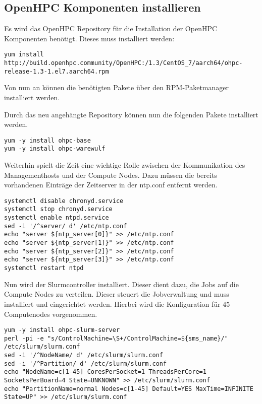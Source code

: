 \subsection{OpenHPC Komponenten installieren}
Es wird das OpenHPC Repository für die Installation der OpenHPC Komponenten benötigt. Dieses muss installiert werden:

\begin{lstlisting}
yum install http://build.openhpc.community/OpenHPC:/1.3/CentOS_7/aarch64/ohpc-release-1.3-1.el7.aarch64.rpm
\end{lstlisting}

Von nun an können die benötigten Pakete über den RPM-Paketmanager installiert werden.

Durch das neu angehängte Repository können nun die folgenden Pakete installiert werden.

\begin{lstlisting}
yum -y install ohpc-base
yum -y install ohpc-warewulf
\end{lstlisting}

Weiterhin spielt die Zeit eine wichtige Rolle zwischen der Kommunikation des Managementhosts und der Compute Nodes. Dazu müssen die bereits vorhandenen Einträge der Zeitserver in der ntp.conf entfernt werden.


\begin{lstlisting}
systemctl disable chronyd.service
systemctl stop chronyd.service
systemctl enable ntpd.service
sed -i '/^server/ d' /etc/ntp.conf
echo "server ${ntp_server[0]}" >> /etc/ntp.conf
echo "server ${ntp_server[1]}" >> /etc/ntp.conf
echo "server ${ntp_server[2]}" >> /etc/ntp.conf
echo "server ${ntp_server[3]}" >> /etc/ntp.conf
systemctl restart ntpd
\end{lstlisting}

Nun wird der Slurmcontroller installiert. Dieser dient dazu, die Jobs auf die Compute Nodes zu verteilen. Dieser steuert die Jobverwaltung und muss installiert und eingerichtet werden. Hierbei wird die Konfiguration für 45 Computenodes vorgenommen.

\begin{lstlisting}
yum -y install ohpc-slurm-server
perl -pi -e "s/ControlMachine=\S+/ControlMachine=${sms_name}/" /etc/slurm/slurm.conf
sed -i '/^NodeName/ d' /etc/slurm/slurm.conf
sed -i '/^Partition/ d' /etc/slurm/slurm.conf
echo "NodeName=c[1-45] CoresPerSocket=1 ThreadsPerCore=1 SocketsPerBoard=4 State=UNKNOWN" >> /etc/slurm/slurm.conf
echo "PartitionName=normal Nodes=c[1-45] Default=YES MaxTime=INFINITE State=UP" >> /etc/slurm/slurm.conf
\end{lstlisting}

